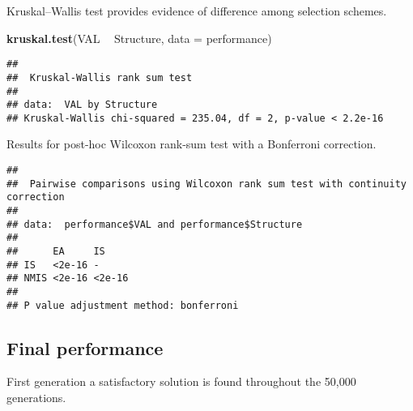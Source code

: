 \documentclass[]{book}
\newenvironment{Shaded}{\begin{snugshade}}{\end{snugshade}}
\newcommand{\DataTypeTok}[1]{\textcolor[rgb]{0.13,0.29,0.53}{#1}}
\newcommand{\KeywordTok}[1]{\textcolor[rgb]{0.13,0.29,0.53}{\textbf{#1}}}
\newcommand{\NormalTok}[1]{#1}
\newcommand{\OperatorTok}[1]{\textcolor[rgb]{0.81,0.36,0.00}{\textbf{#1}}}
\newcommand{\OtherTok}[1]{\textcolor[rgb]{0.56,0.35,0.01}{#1}}
\newcommand{\StringTok}[1]{\textcolor[rgb]{0.31,0.60,0.02}{#1}}
\begin{document}
Kruskal--Wallis test provides evidence of difference among selection schemes.

\begin{Shaded}
\begin{Highlighting}[]
\KeywordTok{kruskal.test}\NormalTok{(VAL }\OperatorTok{~}\StringTok{ }\NormalTok{Structure, }\DataTypeTok{data =}\NormalTok{ performance)}
\end{Highlighting}
\end{Shaded}

\begin{verbatim}
## 
##  Kruskal-Wallis rank sum test
## 
## data:  VAL by Structure
## Kruskal-Wallis chi-squared = 235.04, df = 2, p-value < 2.2e-16
\end{verbatim}

Results for post-hoc Wilcoxon rank-sum test with a Bonferroni correction.

\begin{Shaded}
\end{Shaded}

\begin{verbatim}
## 
##  Pairwise comparisons using Wilcoxon rank sum test with continuity correction 
## 
## data:  performance$VAL and performance$Structure 
## 
##      EA     IS    
## IS   <2e-16 -     
## NMIS <2e-16 <2e-16
## 
## P value adjustment method: bonferroni
\end{verbatim}

\hypertarget{final-performance}{%
\subsection{Final performance}\label{final-performance}}

First generation a satisfactory solution is found throughout the 50,000 generations.
\end{document}
